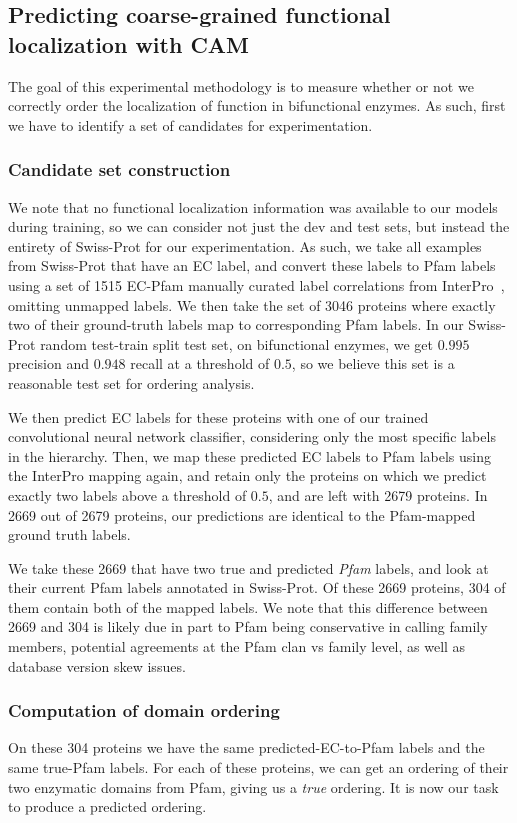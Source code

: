 \pagebreak
\subsection{Predicting coarse-grained functional localization with CAM}
The goal of this experimental methodology is to measure whether or not we correctly order the localization of function in bifunctional enzymes. As such, first we have to identify a set of candidates for experimentation.

\subsubsection{Candidate set construction}
We note that no functional localization information was available to our models during training, so we can consider not just the dev and test sets, but instead the entirety of Swiss-Prot for our experimentation. As such, we take all examples from Swiss-Prot that have an EC label, and convert these labels to Pfam labels using a set of 1515 EC-Pfam manually curated label correlations from InterPro~\cite{mitchell2015interpro}, omitting unmapped labels. We then take the set of 3046 proteins where exactly two of their ground-truth labels map to corresponding Pfam labels. In our Swiss-Prot random test-train split test set, on bifunctional enzymes, we get $0.995$ precision and $0.948$ recall at a threshold of $0.5$, so we believe this set is a reasonable test set for ordering analysis.

We then predict EC labels for these proteins with one of our trained convolutional neural network classifier, considering only the most specific labels in the hierarchy. Then, we map these predicted EC labels to Pfam labels using the InterPro mapping again, and retain only the proteins on which we predict exactly two labels above a threshold of $0.5$, and are left with 2679 proteins. In 2669 out of 2679 proteins, our predictions are identical to the Pfam-mapped ground truth labels. 

We take these 2669 that have two true and predicted \textit{Pfam} labels, and look at their current Pfam labels annotated in Swiss-Prot. Of these 2669 proteins, 304 of them contain both of the mapped labels. We note that this difference between 2669 and 304 is likely due in part to Pfam being conservative in calling family members, potential agreements at the Pfam clan vs family level, as well as database version skew issues.

\subsubsection{Computation of domain ordering}
On these 304 proteins we have the same predicted-EC-to-Pfam labels and the same true-Pfam labels. For each of these proteins, we can get an ordering of their two enzymatic domains from Pfam, giving us a \textit{true} ordering. It is now our task to produce a predicted ordering.

